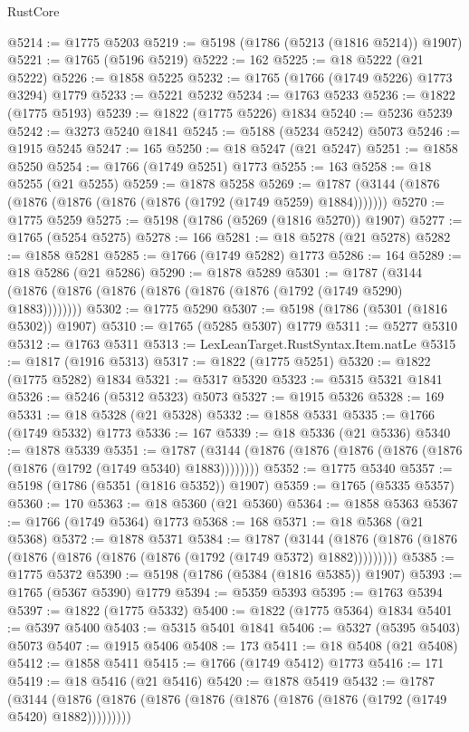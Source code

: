 \begin{lexlean}{RustCore}
\begin{coremodule}
@5214 := @1775 @5203
@5219 := @5198 (@1786 (@5213 (@1816 @5214)) @1907)
@5221 := @1765 (@5196 @5219)
@5222 := 162
@5225 := @18 @5222 (@21 @5222)
@5226 := @1858 @5225
@5232 := @1765 (@1766 (@1749 @5226) @1773 @3294) @1779
@5233 := @5221 @5232
@5234 := @1763 @5233
@5236 := @1822 (@1775 @5193)
@5239 := @1822 (@1775 @5226) @1834
@5240 := @5236 @5239
@5242 := @3273 @5240 @1841
@5245 := @5188 (@5234 @5242) @5073
@5246 := @1915 @5245
@5247 := 165
@5250 := @18 @5247 (@21 @5247)
@5251 := @1858 @5250
@5254 := @1766 (@1749 @5251) @1773
@5255 := 163
@5258 := @18 @5255 (@21 @5255)
@5259 := @1878 @5258
@5269 := @1787 (@3144 (@1876 (@1876 (@1876 (@1876 (@1876 (@1792 (@1749 @5259) @1884)))))))
@5270 := @1775 @5259
@5275 := @5198 (@1786 (@5269 (@1816 @5270)) @1907)
@5277 := @1765 (@5254 @5275)
@5278 := 166
@5281 := @18 @5278 (@21 @5278)
@5282 := @1858 @5281
@5285 := @1766 (@1749 @5282) @1773
@5286 := 164
@5289 := @18 @5286 (@21 @5286)
@5290 := @1878 @5289
@5301 := @1787 (@3144 (@1876 (@1876 (@1876 (@1876 (@1876 (@1876 (@1792 (@1749 @5290) @1883))))))))
@5302 := @1775 @5290
@5307 := @5198 (@1786 (@5301 (@1816 @5302)) @1907)
@5310 := @1765 (@5285 @5307) @1779
@5311 := @5277 @5310
@5312 := @1763 @5311
@5313 := LexLeanTarget.RustSyntax.Item.natLe
@5315 := @1817 (@1916 @5313)
@5317 := @1822 (@1775 @5251)
@5320 := @1822 (@1775 @5282) @1834
@5321 := @5317 @5320
@5323 := @5315 @5321 @1841
@5326 := @5246 (@5312 @5323) @5073
@5327 := @1915 @5326
@5328 := 169
@5331 := @18 @5328 (@21 @5328)
@5332 := @1858 @5331
@5335 := @1766 (@1749 @5332) @1773
@5336 := 167
@5339 := @18 @5336 (@21 @5336)
@5340 := @1878 @5339
@5351 := @1787 (@3144 (@1876 (@1876 (@1876 (@1876 (@1876 (@1876 (@1792 (@1749 @5340) @1883))))))))
@5352 := @1775 @5340
@5357 := @5198 (@1786 (@5351 (@1816 @5352)) @1907)
@5359 := @1765 (@5335 @5357)
@5360 := 170
@5363 := @18 @5360 (@21 @5360)
@5364 := @1858 @5363
@5367 := @1766 (@1749 @5364) @1773
@5368 := 168
@5371 := @18 @5368 (@21 @5368)
@5372 := @1878 @5371
@5384 := @1787
    (@3144 (@1876 (@1876 (@1876 (@1876 (@1876 (@1876 (@1876 (@1792 (@1749 @5372) @1882)))))))))
@5385 := @1775 @5372
@5390 := @5198 (@1786 (@5384 (@1816 @5385)) @1907)
@5393 := @1765 (@5367 @5390) @1779
@5394 := @5359 @5393
@5395 := @1763 @5394
@5397 := @1822 (@1775 @5332)
@5400 := @1822 (@1775 @5364) @1834
@5401 := @5397 @5400
@5403 := @5315 @5401 @1841
@5406 := @5327 (@5395 @5403) @5073
@5407 := @1915 @5406
@5408 := 173
@5411 := @18 @5408 (@21 @5408)
@5412 := @1858 @5411
@5415 := @1766 (@1749 @5412) @1773
@5416 := 171
@5419 := @18 @5416 (@21 @5416)
@5420 := @1878 @5419
@5432 := @1787
    (@3144 (@1876 (@1876 (@1876 (@1876 (@1876 (@1876 (@1876 (@1792 (@1749 @5420) @1882)))))))))

\end{coremodule}
\end{lexlean}
